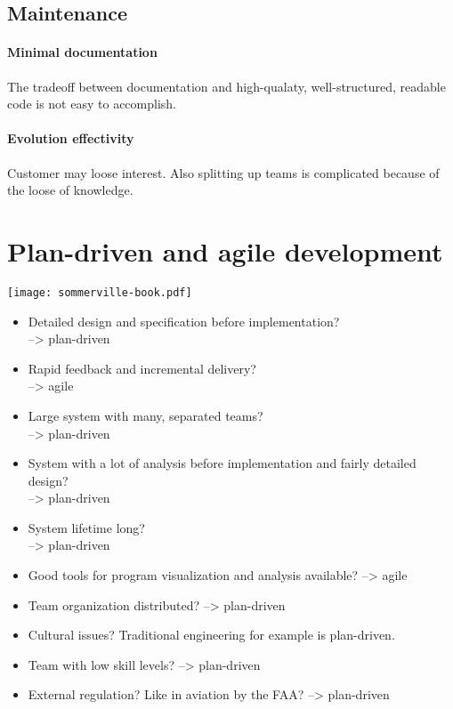 \documentclass[a4paper,11pt,twocolumn]{report}
\begin{document}
    \subsection{Maintenance}
    \paragraph{Minimal documentation}
    The tradeoff between documentation and high-qualaty, well-structured,
    readable code is not easy to accomplish. 
    \paragraph{Evolution effectivity}
    Customer may loose interest. Also splitting up teams is complicated because
    of the loose of knowledge.
    \section{Plan-driven and agile development}
    \texttt{[image: sommerville-book.pdf]}\\
    \begin{itemize}
        \item Detailed design and specification before implementation?\\
            --> plan-driven
        \item Rapid feedback and incremental delivery?\\
            --> agile
        \item Large system with many, separated teams?\\
            --> plan-driven
        \item System with a lot of analysis before implementation and fairly
            detailed design?\\
            --> plan-driven
        \item System lifetime long?\\
            --> plan-driven
        \item Good tools for program visualization and analysis available?
            --> agile
        \item Team organization distributed?
            --> plan-driven
        \item Cultural issues? Traditional engineering for example is
            plan-driven.
        \item Team with low skill levels?
            --> plan-driven
        \item External regulation? Like in aviation by the FAA?
            --> plan-driven
    \end{itemize}
\end{document}

